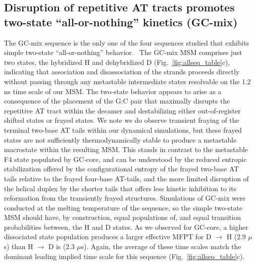 \documentclass[journal=jpcbfk,manuscript=article]{achemso}
\begin{document}



\subsection{Disruption of repetitive AT tracts promotes two-state ``all-or-nothing'' kinetics (GC-mix)}

The GC-mix sequence is the only one of the four sequences studied that exhibits simple two-state ``all-or-nothing'' behavior.~\citep{Xiao2019, Araque2016LatticeCooperativity, Sikora2013ModelingIntermediates, Sanstead2016} The GC-mix MSM comprises just two states, the hybridized H and dehybridized D (Fig.~\ref{fig:allseq_table}c), indicating that association and disassociation of the strands proceeds directly without passing through any metastable intermediate states resolvable on the 1.2 ns time scale of our MSM. The two-state behavior appears to arise as a consequence of the placement of the G:C pair that maximally disrupts the repetitive AT tract within the decamer and destabilizing either out-of-register shifted states or frayed states. We note we do observe transient fraying of the terminal two-base AT tails within our dynamical simulations, but these frayed states are not sufficiently thermodynamically stable to produce a metastable macrostate within the resulting MSM. This stands in contrast to the metastable F4 state populated by GC-core, and can be understood by the reduced entropic stabilization offered by the configurational entropy of the frayed two-base AT tails relative to the frayed four-base AT-tails, and the more limited disruption of the helical duplex by the shorter tails that offers less kinetic inhibition to its reformation from the transiently frayed structures. Simulations of GC-mix were conducted at the melting temperature of the sequence, so the simple two-state MSM should have, by construction, equal populations of, and equal transition probabilities between, the H and D states. As we observed for GC-core, a higher dissociated state population produces a larger effective MFPT for D $\rightarrow$ H (2.9 $\mu$s) than H $\rightarrow$ D is (2.3 $\mu$s). Again, the average of these time scales match the dominant leading implied time scale for this sequence (Fig.~\ref{fig:allseq_table}c).
\end{document}
